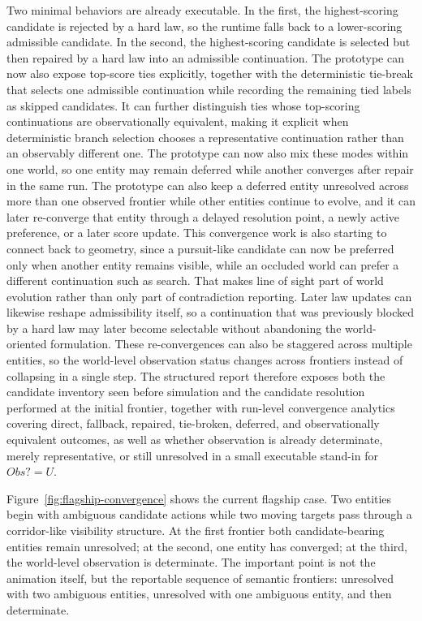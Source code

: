 \documentclass[sigplan,review,anonymous]{acmart}
\begin{document}
Two minimal behaviors are already executable.
In the first, the highest-scoring candidate is rejected by a hard law, so the runtime falls back to a lower-scoring admissible candidate.
In the second, the highest-scoring candidate is selected but then repaired by a hard law into an admissible continuation.
The prototype can now also expose top-score ties explicitly, together with the deterministic tie-break that selects one admissible continuation while recording the remaining tied labels as skipped candidates.
It can further distinguish ties whose top-scoring continuations are observationally equivalent, making it explicit when deterministic branch selection chooses a representative continuation rather than an observably different one.
The prototype can now also mix these modes within one world, so one entity may remain deferred while another converges after repair in the same run.
The prototype can also keep a deferred entity unresolved across more than one observed frontier while other entities continue to evolve, and it can later re-converge that entity through a delayed resolution point, a newly active preference, or a later score update.
This convergence work is also starting to connect back to geometry, since a pursuit-like candidate can now be preferred only when another entity remains visible, while an occluded world can prefer a different continuation such as search. That makes line of sight part of world evolution rather than only part of contradiction reporting.
Later law updates can likewise reshape admissibility itself, so a continuation that was previously blocked by a hard law may later become selectable without abandoning the world-oriented formulation.
These re-convergences can also be staggered across multiple entities, so the world-level observation status changes across frontiers instead of collapsing in a single step.
The structured report therefore exposes both the candidate inventory seen before simulation and the candidate resolution performed at the initial frontier, together with run-level convergence analytics covering direct, fallback, repaired, tie-broken, deferred, and observationally equivalent outcomes, as well as whether observation is already determinate, merely representative, or still unresolved in a small executable stand-in for $Obs? = U$.

Figure~\ref{fig:flagship-convergence} shows the current flagship case.
Two entities begin with ambiguous candidate actions while two moving targets pass through a corridor-like visibility structure.
At the first frontier both candidate-bearing entities remain unresolved; at the second, one entity has converged; at the third, the world-level observation is determinate.
The important point is not the animation itself, but the reportable sequence of semantic frontiers: unresolved with two ambiguous entities, unresolved with one ambiguous entity, and then determinate.
\end{document}
